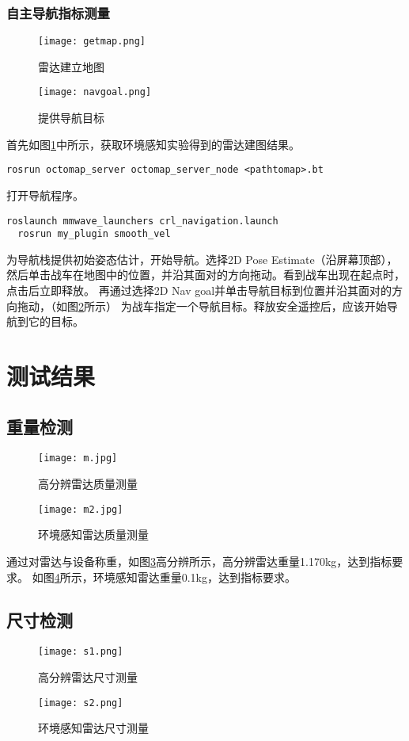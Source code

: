 \documentclass[lang=cn,11pt,a4paper]{elegantpaper}
\begin{document}
\subsubsection{自主导航指标测量}

\begin{figure}[htbp]
  \centering
  \texttt{[image: getmap.png]}
  \caption{雷达建立地图}
  \label{fig:getmap}
\end{figure}
\begin{figure}[htbp]
  \centering
  \texttt{[image: navgoal.png]}
  \caption{提供导航目标}
  \label{fig:goal}
\end{figure}


首先如图\ref{fig:getmap}中所示，获取环境感知实验得到的雷达建图结果。
\begin{lstlisting}[language=ros]
  rosrun octomap_server octomap_server_node <pathtomap>.bt
\end{lstlisting}	
打开导航程序。
\begin{lstlisting}[language=ros]
  roslaunch mmwave_launchers crl_navigation.launch
  rosrun my_plugin smooth_vel
\end{lstlisting}
为导航栈提供初始姿态估计，开始导航。选择2D Pose Estimate（沿屏幕顶部），
然后单击战车在地图中的位置，并沿其面对的方向拖动。看到战车出现在起点时，点击后立即释放。
再通过选择2D Nav goal并单击导航目标到位置并沿其面对的方向拖动，（如图\ref{fig:goal}所示）
为战车指定一个导航目标。释放安全遥控后，应该开始导航到它的目标。

\section{测试结果}
\subsection{重量检测}
\begin{figure}[htbp]
  \centering
  \texttt{[image: m.jpg]}
  \caption{高分辨雷达质量测量}
  \label{fig:m}
\end{figure}
\begin{figure}[htbp]
  \centering
  \texttt{[image: m2.jpg]}
  \caption{环境感知雷达质量测量}
  \label{fig:m2}
\end{figure}
通过对雷达与设备称重，如图\ref{fig:m}高分辨所示，高分辨雷达重量1.170kg，达到指标要求。
如图\ref{fig:m2}所示，环境感知雷达重量0.1kg，达到指标要求。

\subsection{尺寸检测}
\begin{figure}[htbp]
  \centering
  \texttt{[image: s1.png]}
  \caption{高分辨雷达尺寸测量}
  \label{fig:s1}
\end{figure}
\begin{figure}[htbp]
  \centering
  \texttt{[image: s2.png]}
  \caption{环境感知雷达尺寸测量}
  \label{fig:s2}
\end{figure}
\end{document}
